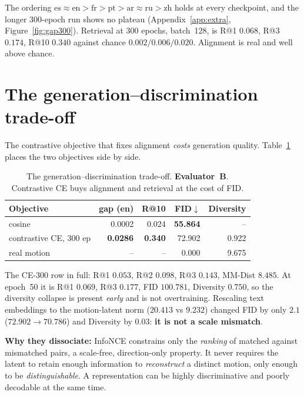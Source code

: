 \documentclass[11pt,a4paper]{report}
\newcommand{\best}[1]{\textbf{#1}}
\begin{document}
The ordering
$\text{es}\approx\text{en}>\text{fr}>\text{pt}>\text{ar}\approx\text{ru}>
\text{zh}$ holds at every checkpoint, and the longer 300-epoch run shows no
plateau (Appendix~\ref{app:extra}, Figure~\ref{fig:gap300}). Retrieval at
300 epochs, batch~128, is R@1 $0.068$, R@3 $0.174$, R@10 $0.340$ against
chance $0.002/0.006/0.020$. Alignment is real and well above chance.

\section{The generation--discrimination trade-off}
\label{sec:tradeoff}

The contrastive objective that fixes alignment \emph{costs} generation
quality. Table~\ref{tab:tradeoff} places the two objectives side by side.

\begin{table}[H]
\centering
\caption{The generation--discrimination trade-off. \textbf{Evaluator~B}.
Contrastive CE buys alignment and retrieval at the cost of FID.}
\label{tab:tradeoff}
\small
\begin{tabular}{@{}lrrrr@{}}
\toprule
Objective & gap (en) & R@10 & FID$\downarrow$ & Diversity \\
\midrule
cosine                & 0.0002 & 0.024 & \best{55.864} & -- \\
contrastive CE, 300 ep & \best{0.0286} & \best{0.340} & 72.902 & 0.922 \\
real motion           & -- & -- & 0.000 & 9.675 \\
\bottomrule
\end{tabular}
\end{table}

The CE-300 row in full: R@1 $0.053$, R@2 $0.098$, R@3 $0.143$, MM-Dist
$8.485$. At epoch~50 it is R@1 $0.069$, R@3 $0.177$, FID $100.781$,
Diversity $0.750$, so the diversity collapse is present \emph{early} and
is not overtraining. Rescaling text embeddings to the motion-latent norm
($20.413$ vs $9.232$) changed FID by only $2.1$ ($72.902\to70.786$) and
Diversity by $0.03$: \textbf{it is not a scale mismatch}.

\textbf{Why they dissociate:} InfoNCE constrains only the \emph{ranking} of
matched against mismatched pairs, a scale-free, direction-only property.
It never requires the latent to retain enough information to
\emph{reconstruct} a distinct motion, only enough to be
\emph{distinguishable}. A representation can be highly discriminative and
poorly decodable at the same time.
\end{document}
